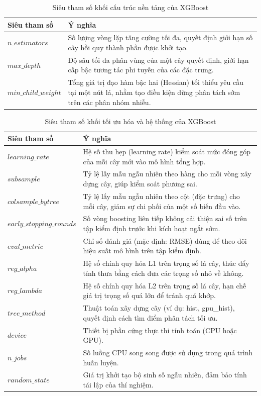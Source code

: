 \begin{table}[H]
\centering
\caption{Siêu tham số khối cấu trúc nền tảng của XGBoost}
\label{tab:xgb_structure}
\renewcommand{\arraystretch}{1.3}
\begin{tabular}{p{4.2cm} p{10.2cm}}
\toprule
\textbf{Siêu tham số} & \textbf{Ý nghĩa} \\
\midrule
$n\_estimators$ & Số lượng vòng lặp tăng cường tối đa, quyết định giới hạn số cây hồi quy thành phần được khởi tạo. \\
$max\_depth$ & Độ sâu tối đa phân vùng của một cây quyết định, giới hạn cấp bậc tương tác phi tuyến của các đặc trưng. \\
$min\_child\_weight$ & Tổng giá trị đạo hàm bậc hai (Hessian) tối thiểu yêu cầu tại một nút lá, nhằm tạo điều kiện dừng phân tách sớm trên các phân nhóm nhiễu. \\
\bottomrule
\end{tabular}
\end{table}

\begin{table}[H]
\centering
\caption{Siêu tham số khối tối ưu hóa và hệ thống của XGBoost}
\label{tab:xgb_optim}
\renewcommand{\arraystretch}{1.3}
\begin{tabular}{p{4.2cm} p{10.2cm}}
\toprule
\textbf{Siêu tham số} & \textbf{Ý nghĩa} \\
\midrule
$learning\_rate$ & Hệ số thu hẹp (learning rate) kiểm soát mức đóng góp của mỗi cây mới vào mô hình tổng hợp. \\
$subsample$ & Tỷ lệ lấy mẫu ngẫu nhiên theo hàng cho mỗi vòng xây dựng cây, giúp kiểm soát phương sai. \\
$colsample\_bytree$ & Tỷ lệ lấy mẫu ngẫu nhiên theo cột (đặc trưng) cho mỗi cây, giảm sự chi phối của một số biến đầu vào. \\
$early\_stopping\_rounds$ & Số vòng boosting liên tiếp không cải thiện sai số trên tập kiểm định trước khi kích hoạt ngắt sớm. \\
$eval\_metric$ & Chỉ số đánh giá (mặc định: RMSE) dùng để theo dõi hiệu suất mô hình trên tập kiểm định. \\
$reg\_alpha$ & Hệ số chính quy hóa L1 trên trọng số lá cây, thúc đẩy tính thưa bằng cách đưa các trọng số nhỏ về không. \\
$reg\_lambda$ & Hệ số chính quy hóa L2 trên trọng số lá cây, hạn chế giá trị trọng số quá lớn để tránh quá khớp. \\
$tree\_method$ & Thuật toán xây dựng cây (ví dụ: hist, gpu\_hist), quyết định cách tìm điểm phân tách tối ưu. \\
$device$ & Thiết bị phần cứng thực thi tính toán (CPU hoặc GPU). \\
$n\_jobs$ & Số luồng CPU song song được sử dụng trong quá trình huấn luyện. \\
$random\_state$ & Giá trị khởi tạo bộ sinh số ngẫu nhiên, đảm bảo tính tái lập của thí nghiệm. \\
\bottomrule
\end{tabular}
\end{table}

